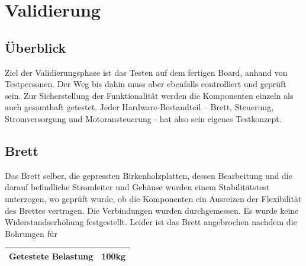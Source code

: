 \chapter{Validierung} \label{Validierung}


\section{Überblick} \label{ValidUeberblick}
Ziel der Validierungsphase ist das Testen auf dem fertigen Board, anhand von Testpersonen. Der Weg bis dahin muss aber ebenfalls controlliert und geprüft sein. Zur Sicherstellung der Funktionalität werden die Komponenten einzeln als auch gesamthaft getestet. 
Jeder Hardware-Bestandteil – Brett, Steuerung, Stromversorgung und Motoransteuerung - hat also sein eigenes Testkonzept.

\section{Brett} \label{ValidBrett}
Das Brett selber, die gepressten Birkenholzplatten, dessen Bearbeitung und die darauf befindliche Stromleiter und Gehäuse wurden einem Stabilitätstest unterzogen, wo geprüft wurde, ob die Komponenten ein Ausreizen der Flexibilität des Brettes vertragen. Die Verbindungen wurden durchgemessen. Es wurde keine Widerstandserhöhung festgestellt. Leider ist das Brett angebrochen nachdem die Bohrungen für
\begin{center}
	\begin{tabular}{l|c}
		\hline 
		Getestete Belastung & 100kg \\ \hline
	\end{tabular} 
\end{center}
